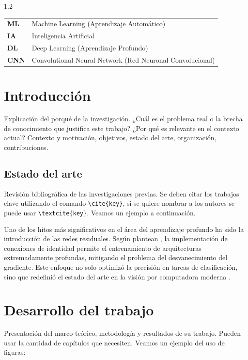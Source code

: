 \documentclass[12pt,a4paper]{report}
\begin{document}
\begin{spacing}{1.2}
\noindent
\begin{tabular}{@{} p{2.5cm} l @{}}
    \textbf{ML}   & Machine Learning (Aprendizaje Automático) \\
    \textbf{IA}   & Inteligencia Artificial \\
    \textbf{DL}   & Deep Learning (Aprendizaje Profundo) \\
    \textbf{CNN}  & Convolutional Neural Network (Red Neuronal Convolucional) \\
\end{tabular}
\end{spacing}


\newpage{}

\chapter{Introducción}
\label{ch:Introducción}
Explicación del porqué de la investigación. ¿Cuál es el problema real o la brecha de conocimiento que justifica este trabajo? ¿Por qué es relevante en el contexto actual?
Contexto y motivación, objetivos, estado del arte, organización, contribuciones.

\section{Estado del arte}
Revisión bibliográfica de las investigaciones previas. Se deben citar los trabajos clave utilizando el comando \texttt{\textbackslash cite\{key\}}, si se quiere nombrar a los autores se puede usar \texttt{\textbackslash textcite\{key\}}. Veamos un ejemplo a continuación.

Uno de los hitos más significativos en el área del aprendizaje profundo ha sido la introducción de las redes residuales. Según plantean \textcite{he2016deep}, la implementación de conexiones de identidad permite el entrenamiento de arquitecturas extremadamente profundas, mitigando el problema del desvanecimiento del gradiente. Este enfoque no solo optimizó la precisión en tareas de clasificación, sino que redefinió el estado del arte en la visión por computadora moderna \cite{he2016deep}.

\chapter{Desarrollo del trabajo}
\label{ch:Desarrollo}
Presentación del marco teórico, metodología y resultados de su trabajo. Pueden usar la cantidad de capítulos que necesiten.
Veamos un ejemplo del uso de figuras:
\end{document}
